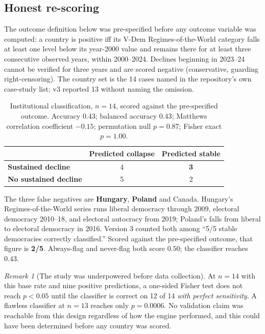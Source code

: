 \documentclass[11pt,a4paper]{article}
\theoremstyle{definition}
\theoremstyle{remark}
\newtheorem{remark}{Remark}[section]
\begin{document}
\subsection{Honest re-scoring}

The outcome definition below was pre-specified before any outcome variable was computed:
a country is positive iff its V-Dem Regimes-of-the-World category falls at least one level
below its year-2000 value and remains there for at least three consecutive observed years,
within 2000--2024. Declines beginning in 2023--24 cannot be verified for three years and are
scored negative (conservative, guarding right-censoring). The country set is the 14 cases named
in the repository's own case-study list; v3 reported 13 without naming the omission.

\begin{table}[H]
\centering
\begin{tabular}{lcc}
\toprule
 & \textbf{Predicted collapse} & \textbf{Predicted stable} \\
\midrule
\textbf{Sustained decline} & 4 & \textbf{3} \\
\textbf{No sustained decline} & 5 & 2 \\
\bottomrule
\end{tabular}
\caption{Institutional classification, $n = 14$, scored against the pre-specified outcome. Accuracy $0.43$; balanced accuracy $0.43$; Matthews correlation coefficient $-0.15$; permutation null $p = 0.87$; Fisher exact $p = 1.00$.}
\end{table}

The three false negatives are \textbf{Hungary}, \textbf{Poland} and Canada. Hungary's
Regimes-of-the-World series runs liberal democracy through 2009, electoral democracy 2010--18,
and electoral autocracy from 2019; Poland's falls from liberal to electoral democracy in 2016.
Version 3 counted both among ``5/5 stable democracies correctly classified.'' Scored against the
pre-specified outcome, that figure is \textbf{2/5}. Always-flag and never-flag both score $0.50$;
the classifier reaches $0.43$.

\begin{remark}[The study was underpowered before data collection]
At $n = 14$ with this base rate and nine positive predictions, a one-sided Fisher test does not
reach $p < 0.05$ until the classifier is correct on 12 of 14 \emph{with perfect sensitivity}. A
flawless classifier at $n = 13$ reaches only $p = 0.0006$. No validation claim was reachable from
this design regardless of how the engine performed, and this could have been determined before
any country was scored.
\end{remark}
\end{document}
